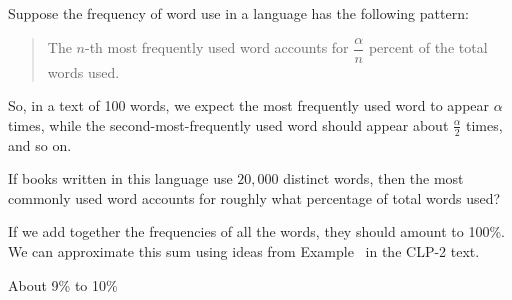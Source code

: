 


\begin{question}\label{probs3.2_Zipf1}
	Suppose the frequency of word use in a language has the following pattern:
	\begin{quote} \color{blue}The $n$-th most frequently used word accounts for $\dfrac{\alpha}{n}$ percent of the total words used.
	\end{quote} So, in a text of 100 words, we expect the most frequently used word to appear $\alpha$ times, while the second-most-frequently used word should appear about $\frac{\alpha}{2}$ times, and so on.

	If books written in this language use $20,000$ distinct words, then the most commonly used word accounts for roughly what percentage of total words used?

\end{question}
\begin{hint}
	If we add together the frequencies of all the words, they should amount to 100\%. We can approximate this sum using ideas from Example~ in the CLP-2 text.
\end{hint}
\begin{answer}
	About 9\% to 10\%
\end{answer}

